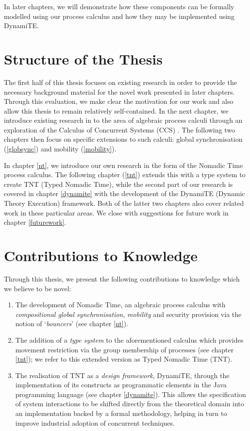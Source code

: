 In later chapters, we will demonstrate how these components can be
formally modelled using our process calculus and how they may be
implemented using DynamiTE.

\section{Structure of the Thesis}

The first half of this thesis focuses on existing research in order to
provide the necessary background material for the novel work presented
in later chapters.  Through this evaluation, we make clear the
motivation for our work and also allow this thesis to remain
relatively self-contained.  In the next chapter, we introduce existing
research in to the area of algebraic process calculi through an
exploration of the Calculus of Concurrent Systems (CCS)
\cite{milner:ccs}.  The following two chapters then focus on specific
extensions to such calculi: global synchronisation (\ref{globsync})
and mobility (\ref{mobility}).

In chapter \ref{nt}, we introduce our own research in the form of the
Nomadic Time process calculus.  The following chapter (\ref{tnt})
extends this with a type system to create TNT (Typed Nomadic Time),
while the second part of our research is covered in chapter
\ref{dynamite} with the development of the DynamiTE (Dynamic Theory
Execution) framework.  Both of the latter two chapters also cover
related work in these particular areas.  We close with suggestions for
future work in chapter \ref{futurework}.

\section{Contributions to Knowledge}

Through this thesis, we present the following contributions to
knowledge which we believe to be novel:

\begin{enumerate}
\item The development of Nomadic Time, an algebraic process calculus
  with \emph{compositional global synchronisation}, \emph{mobility}
  and security provision via the notion of `\emph{bouncers}'
  (see chapter \ref{nt}).
\item The addition of a \emph{type system} to the aforementioned calculus
  which provides movement restriction via the group membership of
  processes (see chapter \ref{tnt}); we refer to this extended
  version as Typed Nomadic Time (TNT).
\item The realisation of TNT as a \emph{design framework}, DynamiTE,
  through the implementation of its constructs as programmatic
  elements in the Java programming language (see chapter
  \ref{dynamite}).  This allows the specification of system
  interactions to be shifted directly from the theoretical domain into
  an implementation backed by a formal methodology, helping in turn to
  improve industrial adoption of concurrent techniques.
\end{enumerate}

